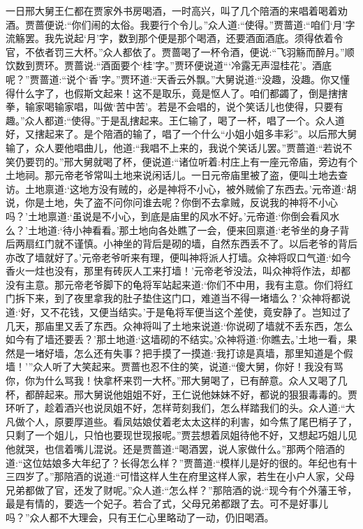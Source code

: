 \begin{parag}
    一日邢大舅王仁都在贾家外书房喝酒，一时高兴，叫了几个陪酒的来唱着喝着劝酒。贾蔷便说:“你们闹的太俗。我要行个令儿。”众人道:“使得。”贾蔷道:“咱们‘月’字流觞罢。我先说起‘月’字，数到那个便是那个喝酒，还要酒面酒底。须得依着令官，不依者罚三大杯。”众人都依了。贾蔷喝了一杯令酒，便说:“飞羽觞而醉月。”顺饮数到贾环。贾蔷说:“酒面要个‘桂’字。”贾环便说道“‘冷露无声湿桂花’。酒底呢？”贾蔷道:“说个‘香’字。”贾环道:“天香云外飘。”大舅说道:“没趣，没趣。你又懂得什么字了，也假斯文起来！这不是取乐，竟是怄人了。咱们都蠲了，倒是搳搳拳，输家喝输家唱，叫做‘苦中苦’。若是不会唱的，说个笑话儿也使得，只要有趣。”众人都道:“使得。”于是乱搳起来。王仁输了，喝了一杯，唱了一个。众人道好，又搳起来了。是个陪酒的输了，唱了一个什么“小姐小姐多丰彩”。以后邢大舅输了，众人要他唱曲儿，他道:“我唱不上来的，我说个笑话儿罢。”贾蔷道:“若说不笑仍要罚的。”邢大舅就喝了杯，便说道:“诸位听着:村庄上有一座元帝庙，旁边有个土地祠。那元帝老爷常叫土地来说闲话儿。一日元帝庙里被了盗，便叫土地去查访。土地禀道:‘这地方没有贼的，必是神将不小心，被外贼偷了东西去。’元帝道:‘胡说，你是土地，失了盗不问你问谁去呢？你倒不去拿贼，反说我的神将不小心吗？’土地禀道:‘虽说是不小心，到底是庙里的风水不好。’元帝道:‘你倒会看风水么？’土地道:‘待小神看看。’那土地向各处瞧了一会，便来回禀道:‘老爷坐的身子背后两扇红门就不谨慎。小神坐的背后是砌的墙，自然东西丢不了。以后老爷的背后亦改了墙就好了。’元帝老爷听来有理，便叫神将派人打墙。众神将叹口气道:‘如今香火一炷也没有，那里有砖灰人工来打墙！’元帝老爷没法，叫众神将作法，却都没有主意。那元帝老爷脚下的龟将军站起来道:‘你们不中用，我有主意。你们将红门拆下来，到了夜里拿我的肚子垫住这门口，难道当不得一堵墙么？’众神将都说道:‘好，又不花钱，又便当结实。’于是龟将军便当这个差使，竟安静了。岂知过了几天，那庙里又丢了东西。众神将叫了土地来说道:‘你说砌了墙就不丢东西，怎么如今有了墙还要丢？’那土地道:‘这墙砌的不结实。’众神将道:‘你瞧去。’土地一看，果然是一堵好墙，怎么还有失事？把手摸了一摸道:‘我打谅是真墙，那里知道是个假墙！’”众人听了大笑起来。贾蔷也忍不住的笑，说道:“傻大舅，你好！我没有骂你，你为什么骂我！快拿杯来罚一大杯。”邢大舅喝了，已有醉意。众人又喝了几杯，都醉起来。邢大舅说他姐姐不好，王仁说他妹妹不好，都说的狠狠毒毒的。贾环听了，趁着酒兴也说凤姐不好，怎样苛刻我们，怎么样踏我们的头。众人道:“大凡做个人，原要厚道些。看凤姑娘仗着老太太这样的利害，如今焦了尾巴梢子了，只剩了一个姐儿，只怕也要现世现报呢。”贾芸想着凤姐待他不好，又想起巧姐儿见他就哭，也信着嘴儿混说。还是贾蔷道:“喝酒罢，说人家做什么。”那两个陪酒的道:“这位姑娘多大年纪了？长得怎么样？”贾蔷道:“模样儿是好的很的。年纪也有十三四岁了。”那陪酒的说道:“可惜这样人生在府里这样人家，若生在小户人家，父母兄弟都做了官，还发了财呢。”众人道:“怎么样？”那陪酒的说:“现今有个外藩王爷，最是有情的，要选一个妃子。若合了式，父母兄弟都跟了去。可不是好事儿吗？”众人都不大理会，只有王仁心里略动了一动，仍旧喝酒。
\end{parag}


